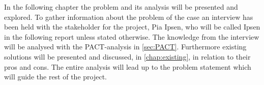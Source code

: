 In the following chapter the problem and its analysis will be presented and explored. 
To gather information about the problem of the case an interview has been held with the stakeholder for the project, Pia Ipsen, who will be called Ipsen in the following report unless stated otherwise.
The knowledge from the interview will be analysed with the PACT-analysis in \cref{sec:PACT}.
Furthermore existing solutions will be presented and discussed, in \cref{chap:existing}, in relation to their pros and cons.
The entire analysis will lead up to the problem statement which will guide the rest of the project.

